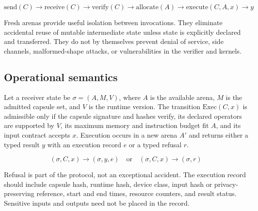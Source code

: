 \documentclass[11pt]{article}
\begin{document}
\[
\text{send}(C) \to \text{receive}(C) \to \text{verify}(C) \to \text{allocate}(A) \to \text{execute}(C,A,x) \to y
\]

Fresh arenas provide useful isolation between invocations. They eliminate accidental reuse of mutable intermediate state unless state is explicitly declared and transferred. They do not by themselves prevent denial of service, side channels, malformed-shape attacks, or vulnerabilities in the verifier and kernels.

\subsection{Operational semantics}
Let a receiver state be $\sigma = (A, M, V)$, where $A$ is the available arena, $M$ is the admitted capsule set, and $V$ is the runtime version. The transition $\mathrm{Exec}(C,x)$ is admissible only if the capsule signature and hashes verify, its declared operators are supported by $V$, its maximum memory and instruction budget fit $A$, and its input contract accepts $x$. Execution occurs in a new arena $A'$ and returns either a typed result $y$ with an execution record $e$ or a typed refusal $r$.

\[
(\sigma, C, x) \to (\sigma, y, e) \quad \text{or} \quad (\sigma, C, x) \to (\sigma, r)
\]

Refusal is part of the protocol, not an exceptional accident. The execution record should include capsule hash, runtime hash, device class, input hash or privacy-preserving reference, start and end times, resource counters, and result status. Sensitive inputs and outputs need not be placed in the record.
\end{document}
